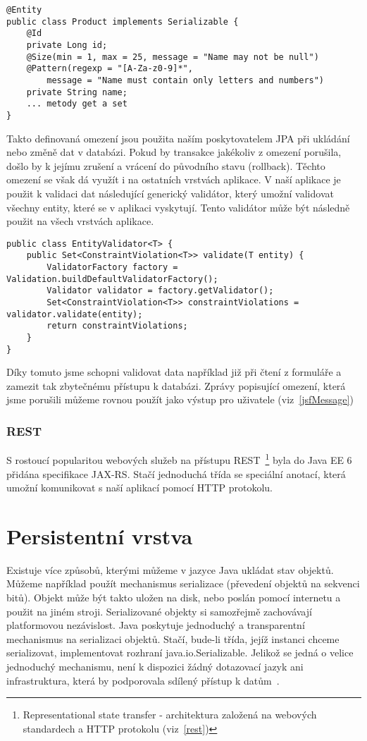 \documentclass[122pt,oneside]{fithesis}
\begin{document}
\begin{lstlisting}
@Entity
public class Product implements Serializable {
	@Id
	private Long id;
	@Size(min = 1, max = 25, message = "Name may not be null")
	@Pattern(regexp = "[A-Za-z0-9]*", 
		message = "Name must contain only letters and numbers")
	private String name;
	... metody get a set
}
\end{lstlisting}

Takto definovaná omezení jsou použita naším poskytovatelem JPA při ukládání nebo změně dat v databázi. Pokud by transakce jakékoliv z omezení porušila, došlo by k jejímu zrušení a vrácení do původního stavu (rollback). Těchto omezení se však dá využít i na ostatních vrstvách aplikace. V naší aplikace je použit k validaci dat následující generický validátor, který umožní validovat všechny entity, které se v aplikaci vyskytují. Tento validátor může být následně použit na všech vrstvách aplikace.

\begin{lstlisting}
public class EntityValidator<T> {
	public Set<ConstraintViolation<T>> validate(T entity) {
		ValidatorFactory factory = Validation.buildDefaultValidatorFactory();
		Validator validator = factory.getValidator();
		Set<ConstraintViolation<T>> constraintViolations = validator.validate(entity);
		return constraintViolations;
	}
}
\end{lstlisting}

Díky tomuto jsme schopni validovat data například již při čtení z formuláře a zamezit tak zbytečnému přístupu k databázi. Zprávy popisující omezení, která jsme porušili můžeme rovnou použít jako výstup pro uživatele (viz~\ref{jsfMessage})

\subsection{REST}
S rostoucí popularitou webových služeb na přístupu REST~\footnote{Representational state transfer - architektura založená na webových standardech a HTTP protokolu (viz~\ref{rest})} byla do Java EE 6 přidána specifikace JAX-RS. Stačí jednoduchá třída se speciální anotací, která umožní komunikovat s naší aplikací pomocí HTTP protokolu.

\chapter{Persistentní vrstva}
Existuje více způsobů, kterými můžeme v jazyce Java ukládat stav objektů. Můžeme například použít mechanismus serializace (převedení objektů na sekvenci bitů). Objekt může být takto uložen na disk, nebo poslán pomocí internetu a použit na jiném stroji. Serializované objekty si samozřejmě zachovávají platformovou nezávislost. Java poskytuje jednoduchý a transparentní mechanismus na serializaci objektů. Stačí, bude-li třída, jejíž instanci chceme serializovat, implementovat rozhraní java.io.Serializable. Jelikož se jedná o velice jednoduchý mechanismu, není k dispozici žádný dotazovací jazyk ani infrastruktura, která by podporovala sdílený přístup k datům~\cite{goncalves09}.
\end{document}

